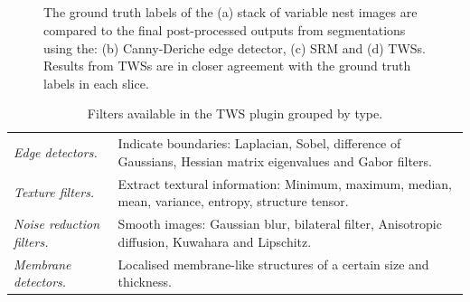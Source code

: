 \begin{figure}[!htbp] \myfloatalign
{} \\
 \\
 \\
 \\
\caption[Comparison of segmentation methods.]{The ground truth labels of the (a) stack of variable nest images are compared to the final post-processed outputs from segmentations using the: (b) Canny-Deriche edge detector, (c) \ac{SRM} and (d) \acp{TWS}. Results from \acp{TWS} are in closer agreement with the ground truth labels in each slice.}\label{fig:segment-finalcounts_all}
\end{figure}

\begin{table}[!htbp]\myfloatalign \caption[Trainable  Weka Segmentation filters.]{Filters available in the TWS plugin grouped by type.}\label{tab:tws-features} 
\begin{tabular}{lp{3.0in}}\toprule
\emph{Edge detectors.} & Indicate boundaries: Laplacian, Sobel, difference of Gaussians, Hessian matrix eigenvalues and Gabor filters. \\
\emph{Texture filters.} & Extract textural information: Minimum, maximum, median, mean, variance, entropy, structure tensor. \\
\emph{Noise reduction filters.} & Smooth images: Gaussian blur, bilateral filter, Anisotropic diffusion, Kuwahara and Lipschitz. \\
\emph{Membrane detectors.} & Localised membrane-like structures of a certain size and thickness. \\ \bottomrule
\end{tabular}
\end{table}

